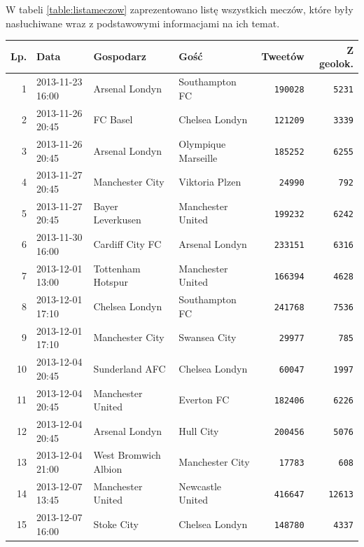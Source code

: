 W tabeli \ref{table:listameczow} zaprezentowano listę wszystkich meczów, które
były nasłuchiwane wraz z podstawowymi informacjami na ich temat.



\clearpage

\begin{table}[ht!]  
\begin{center}  
\begin{tabular}{|r|l|l|l|r|r|}
\hline
Lp. & Data & Gospodarz & Gość & Tweetów & Z geolok.
\\ \hline 
1 & 2013-11-23 16:00 & Arsenal Londyn & Southampton FC & \texttt{190028} & \texttt{5231}	\\ \hline
2 & 2013-11-26 20:45 & FC Basel & Chelsea Londyn & \texttt{121209} & \texttt{3339}	\\ \hline
3 & 2013-11-26 20:45 & Arsenal Londyn & Olympique Marseille & \texttt{185252} & \texttt{6255}	\\ \hline
4 & 2013-11-27 20:45 & Manchester City & Viktoria Plzen & \texttt{24990} & \texttt{792}	\\ \hline
5 & 2013-11-27 20:45 & Bayer Leverkusen & Manchester United & \texttt{199232} & \texttt{6242}	\\ \hline
6 & 2013-11-30 16:00 & Cardiff City FC & Arsenal Londyn & \texttt{233151} & \texttt{6316}	\\ \hline
7 & 2013-12-01 13:00 & Tottenham Hotspur & Manchester United & \texttt{166394} & \texttt{4628}	\\ \hline
8 & 2013-12-01 17:10 & Chelsea Londyn & Southampton FC & \texttt{241768} & \texttt{7536}	\\ \hline
9 & 2013-12-01 17:10 & Manchester City & Swansea City & \texttt{29977} & \texttt{785}	\\ \hline
10 & 2013-12-04 20:45 & Sunderland AFC & Chelsea Londyn & \texttt{60047} & \texttt{1997}	\\ \hline
11 & 2013-12-04 20:45 & Manchester United & Everton FC & \texttt{182406} & \texttt{6226}	\\ \hline
12 & 2013-12-04 20:45 & Arsenal Londyn & Hull City & \texttt{200456} & \texttt{5076}	\\ \hline
13 & 2013-12-04 21:00 & West Bromwich Albion & Manchester City & \texttt{17783} & \texttt{608}	\\ \hline
14 & 2013-12-07 13:45 & Manchester United & Newcastle United & \texttt{416647} & \texttt{12613}	\\ \hline
15 & 2013-12-07 16:00 & Stoke City & Chelsea Londyn & \texttt{148780} & \texttt{4337}	\\ \hline

\end{tabular}
\end{center}
\end{table}
